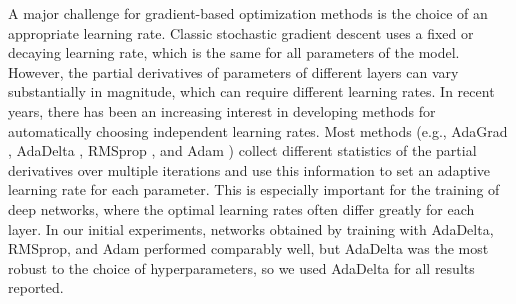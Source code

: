 A major challenge for gradient-based optimization methods is the choice of an
appropriate learning rate. Classic stochastic gradient descent \cite{LeCun1998}
uses a fixed or decaying learning rate, which is the same for all parameters of
the model. However, the partial derivatives of parameters of different layers
can vary substantially in magnitude, which can require different learning rates.
In recent years, there has been an increasing interest in developing methods for
automatically choosing independent learning rates. Most methods (e.g., AdaGrad
\cite{duchi2011adaptive}, AdaDelta \cite{zeiler2012adadelta}, RMSprop
\cite{dauphin2015rmsprop}, and Adam \cite{kingma2014adam}) collect different
statistics of the partial derivatives over multiple iterations and use this
information to set an adaptive learning rate for each parameter. This is
especially important for the training of deep networks, where the optimal
learning rates often differ greatly for each layer. In our initial experiments,
networks obtained by training with AdaDelta, RMSprop, and Adam performed
comparably well, but AdaDelta was the most robust to the choice of
hyperparameters, so we used AdaDelta for all results reported.

